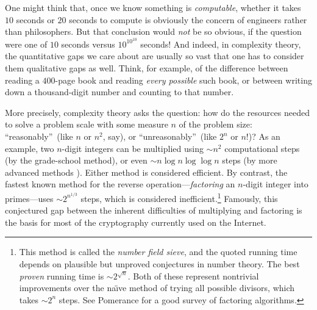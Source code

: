 \documentclass[12pt,onecolumn]{article}%
\begin{document}
One might think that, once we know something is \textit{computable}, whether
it takes $10$ seconds or $20$ seconds to compute is obviously the concern of
engineers rather than philosophers. But that conclusion would \textit{not}
be so obvious, if the question were one of $10$ seconds versus $10^{10^{10}}$
seconds! And indeed, in complexity theory, the quantitative gaps we care
about are usually so vast that one has to consider them qualitative gaps as
well. Think, for example, of the difference between reading a $400$-page
book and reading \textit{every possible} such book, or between writing down a
thousand-digit number and counting to that number.

More precisely, complexity theory asks the question: how do the resources
needed to solve a problem scale with some measure $n$ of the problem
size: \textquotedblleft reasonably\textquotedblright\  (like $n$ or $n^{2}$,
say), or \textquotedblleft unreasonably\textquotedblright\  (like $2^{n}$ or
$n!$)? As an example, two $n$-digit integers can be multiplied using $\sim
n^{2}$ computational steps (by the grade-school method), or even $\sim n\log
n\log\log n$ steps (by more advanced methods \cite{schonhagestrassen}).
 Either method is considered efficient. By contrast, the fastest known
method for the reverse operation---\textit{factoring} an $n$-digit integer
into primes---uses $\sim2^{n^{1/3}}$ steps, which is considered
inefficient.\footnote{This method is called the \textit{number field sieve},
and the quoted running time depends on plausible but unproved conjectures in
number theory. The best \textit{proven} running time is $\sim2^{\sqrt{n}}$.
 Both of these represent nontrivial improvements over the na\"{\i}ve method
of trying all possible divisors, which takes $\sim2^{n}$ steps. See
Pomerance \cite{pomerance} for a good survey of factoring algorithms.}
 Famously, this conjectured gap between the inherent difficulties of
multiplying and factoring is the basis for most of the cryptography currently
used on the Internet.
\end{document}
